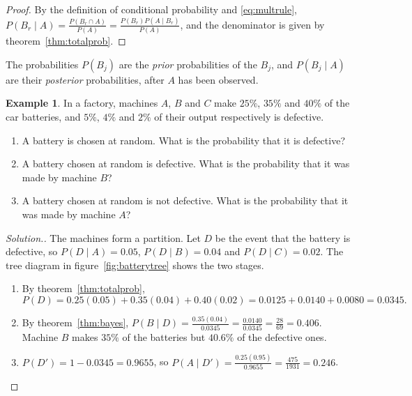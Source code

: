 \documentclass[12pt,a4paper]{report}
\theoremstyle{definition}
\newtheorem{example}[thm]{Example}
\theoremstyle{plain}
\theoremstyle{definition}
\newenvironment{solution}
  {\renewcommand{\qedsymbol}{}\begin{proof}[\textit{Solution}.]}
  {\end{proof}}
\begin{document}
\begin{proof}
By the definition of conditional probability and \eqref{eq:multrule},
$P(B_r\mid A) = \frac{P(B_r\cap A)}{P(A)} = \frac{P(B_r)P(A\mid B_r)}{P(A)}$, and the
denominator is given by theorem~\ref{thm:totalprob}.
\end{proof}

The probabilities $P(B_j)$ are the \emph{prior} probabilities of the $B_j$, and
$P(B_j\mid A)$ are their \emph{posterior} probabilities, after $A$ has been observed.

\begin{example}
\label{ex:batteries}
In a factory, machines $A$, $B$ and $C$ make $25\%$, $35\%$ and $40\%$ of the car
batteries, and $5\%$, $4\%$ and $2\%$ of their output respectively is defective.
\begin{enumerate}
\item[(i)] A battery is chosen at random. What is the probability that it is defective?
\item[(ii)] A battery chosen at random is defective. What is the probability that it was
made by machine $B$?
\item[(iii)] A battery chosen at random is not defective. What is the probability that
it was made by machine $A$?
\end{enumerate}
\end{example}

\begin{solution}
The machines form a partition. Let $D$ be the event that the battery is defective, so
$P(D\mid A) = 0.05$, $P(D\mid B) = 0.04$ and $P(D\mid C) = 0.02$. The tree diagram in
figure~\ref{fig:batterytree} shows the two stages.
\begin{enumerate}
\item[(i)] By theorem~\ref{thm:totalprob},
\[P(D) = 0.25(0.05) + 0.35(0.04) + 0.40(0.02) = 0.0125 + 0.0140 + 0.0080 = 0.0345 .\]
\item[(ii)] By theorem~\ref{thm:bayes},
$P(B\mid D) = \frac{0.35(0.04)}{0.0345} = \frac{0.0140}{0.0345} = \frac{28}{69} = 0.406$.
Machine $B$ makes $35\%$ of the batteries but $40.6\%$ of the defective ones.
\item[(iii)] $P(D') = 1 - 0.0345 = 0.9655$, so
$P(A\mid D') = \frac{0.25(0.95)}{0.9655} = \frac{475}{1931} = 0.246$.
\end{enumerate}
\end{solution}
\end{document}
